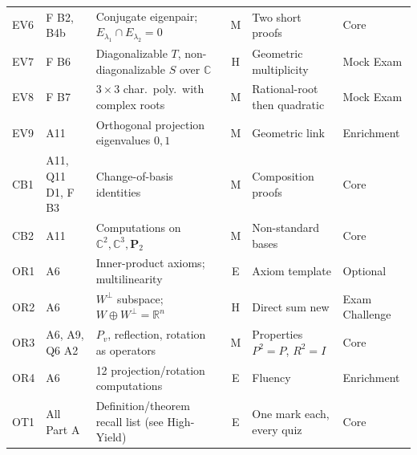 {\begin{longtable}{@{}l p{2.6cm} p{5.2cm} c p{3.9cm} p{1.7cm}@{}}
EV6 & F B2, B4b & Conjugate eigenpair; $E_{\lambda_1}\cap E_{\lambda_2}=0$ & M & Two short proofs & Core\\
EV7 & F B6 & Diagonalizable $T$, non-diagonalizable $S$ over $\mathbb C$ & H & Geometric multiplicity & Mock Exam\\
EV8 & F B7 & $3\times3$ char.\ poly.\ with complex roots & M & Rational-root then quadratic & Mock Exam\\
EV9 & A11 & Orthogonal projection eigenvalues $0,1$ & M & Geometric link & Enrichment\\
CB1 & A11, Q11 D1, F B3 & Change-of-basis identities & M & Composition proofs & Core\\
CB2 & A11 & Computations on $\mathbb C^2,\mathbb C^3,\mathbf P_2$ & M & Non-standard bases & Core\\
OR1 & A6 & Inner-product axioms; multilinearity & E & Axiom template & Optional\\
OR2 & A6 & $W^\perp$ subspace; $W\oplus W^\perp=\mathbb R^n$ & H & Direct sum new & Exam Challenge\\
OR3 & A6, A9, Q6 A2 & $P_v$, reflection, rotation as operators & M & Properties $P^2=P$, $R^2=I$ & Core\\
OR4 & A6 & 12 projection/rotation computations & E & Fluency & Enrichment\\
OT1 & All Part A & Definition/theorem recall list (see High-Yield) & E & One mark each, every quiz & Core\\
\bottomrule\end{longtable}}
